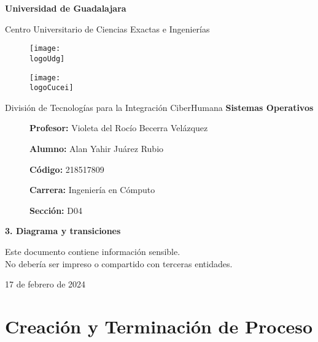 \documentclass[12pt, a4paper]{article} %
\title{\theTitle}
\author{\theAuthor}
\newcommand{\logoUdg}{../../../../attachments/images/portada-udg.jpeg}
\newcommand{\logoCucei}{../../../../attachments/images/portada-cucei.jpeg}
\newcommand{\materia}{Sistemas Operativos}
\newcommand{\theTitle}{3. Diagrama y transiciones}
\newcommand{\profesor}{Violeta del Rocío Becerra Velázquez}
\newcommand{\theAuthor}{Alan Yahir Juárez Rubio}
\newcommand{\code}{218517809}
\newcommand{\carrera}{Ingeniería en Cómputo}
\newcommand{\seccion}{D04}
\newcommand{\startDate}{17 de febrero de 2024}
\newcommand{\nl}{\par\vspace{0.4cm}}
\begin{document}
\cfoot{\ifodd\value{page}\else\thepage\fi} %

\begin{titlepage}
	\centering
	{\huge\textbf{Universidad de Guadalajara}}\par\vspace{0.6cm}
	{\LARGE{Centro Universitario de Ciencias Exactas e Ingenierías}}\vfill
	
	\begin{figure}[h]
		\begin{minipage}[t]{0.45\textwidth}
			\centering
			\texttt{[image: \\logoUdg]}
		\end{minipage}
		\hfill
		\begin{minipage}[t]{0.45\textwidth}
			\centering
			\texttt{[image: \\logoCucei]}
		\end{minipage}
	\end{figure}\vfill
	
	{\Large{División de Tecnologías para la Integración CiberHumana}}\vfill
	{\Large\textbf{\materia}}\vfill
	\begin{figure}[h]
		\centering
		\begin{minipage}[t]{0.75\textwidth}
			{\Large
				\textbf{Profesor:} \profesor\nl
				\textbf{Alumno:} \theAuthor\nl
				\textbf{Código:} \code\nl
				\textbf{Carrera:} \carrera\nl
				\textbf{Sección:} \seccion
			}
		\end{minipage}
	\end{figure}\vfill
	{\LARGE{\textbf{\theTitle}}}\vfill
	
	\begin{tcolorbox}[colback=red!5!white, colframe=red!75!black]
		\centering
		Este documento contiene información sensible.\\
		No debería ser impreso o compartido con terceras entidades.
	\end{tcolorbox}\vfill
	{\large \startDate}\par
\end{titlepage}

\clearpage
\tableofcontents

	

\clearpage

\section{Creación y Terminación de Proceso}
\end{document}

